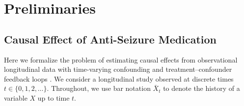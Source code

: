 \section{Preliminaries}
\label{sec:prelim}

\subsection{Causal Effect of Anti-Seizure Medication}

Here we formalize the problem of estimating causal effects from observational longitudinal
data with time-varying confounding and treatment--confounder feedback loops
\cite{parikh2023effects,hernan2020causal,young2020causal,young2011comparative,wanis2024grace,robins2009estimation}.
We consider a longitudinal study observed at discrete times $t \in \{0,1,2,\ldots\}$.
Throughout, we use bar notation $\bar X_t$ to denote the history of a variable $X$ up to
time $t$.

